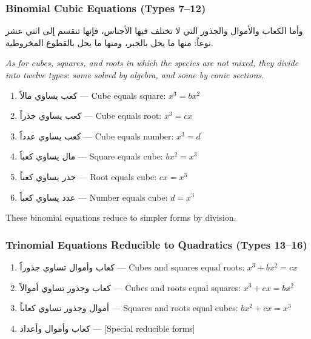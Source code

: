 \subsubsection{Binomial Cubic Equations (Types 7--12)}

\label{subsubsec:binomial}

\begin{Arabic}
وأما الكعاب والأموال والجذور التي لا تختلف فيها الأجناس، فإنها تنقسم إلى اثني عشر نوعاً: منها ما يحل بالجبر، ومنها ما يحل بالقطوع المخروطية.

\end{Arabic}

\textit{As for cubes, squares, and roots in which the species are not mixed, they divide into twelve types: some solved by algebra, and some by conic sections.}

\begin{enumerate}
[label=\arabic*.,resume,noitemsep]
\item 
\textarabic{كعب يساوي مالاً} --- Cube equals square: $x^3 = b x^2$
\item 
\textarabic{كعب يساوي جذراً} --- Cube equals root: $x^3 = c x$
\item 
\textarabic{كعب يساوي عدداً} --- Cube equals number: $x^3 = d$
\item 
\textarabic{مال يساوي كعباً} --- Square equals cube: $b x^2 = x^3$
\item 
\textarabic{جذر يساوي كعباً} --- Root equals cube: $c x = x^3$
\item 
\textarabic{عدد يساوي كعباً} --- Number equals cube: $d = x^3$

\end{enumerate}
These binomial equations reduce to simpler forms by division.

\subsubsection{Trinomial Equations Reducible to Quadratics (Types 13--16)}

\label{subsubsec:trinomial-red}

\begin{enumerate}
[label=\arabic*.,resume,noitemsep]
\item 
\textarabic{كعاب وأموال تساوي جذوراً} --- Cubes and squares equal roots: $x^3 + b x^2 = c x$
\item 
\textarabic{كعاب وجذور تساوي أموالاً} --- Cubes and roots equal squares: $x^3 + c x = b x^2$
\item 
\textarabic{أموال وجذور تساوي كعاباً} --- Squares and roots equal cubes: $b x^2 + c x = x^3$
\item 
\textarabic{كعاب وأموال وأعداد} --- [Special reducible forms]

\end{enumerate}

